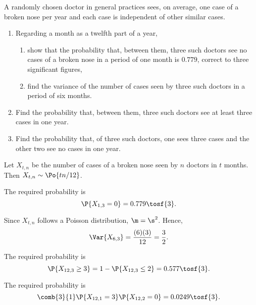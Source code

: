 \begin{problem}
    A randomly chosen doctor in general practices sees, on average, one case of a broken nose per year and each case is independent of other similar cases.

    \begin{enumerate}
        \item Regarding a month as a twelfth part of a year,
        \begin{enumerate}
            \item show that the probability that, between them, three such doctors see no cases of a broken nose in a period of one month is $0.779$, correct to three significant figures,
            \item find the variance of the number of cases seen by three such doctors in a period of six months.
        \end{enumerate}
        \item Find the probability that, between them, three such doctors see at least three cases in one year.
        \item Find the probability that, of three such doctors, one sees three cases and the other two see no cases in one year.
    \end{enumerate}
\end{problem}
\begin{solution}
    Let $X_{t,n}$ be the number of cases of a broken nose seen by $n$ doctors in $t$ months. Then $X_{t,n} \sim \Po{tn/12}$.
    \begin{ppart}
        \begin{psubpart}
            The required probability is \[\P{X_{1,3} = 0} = 0.779 \tosf{3}.\]
        \end{psubpart}
        \begin{psubpart}
            Since $X_{t,n}$ follows a Poisson distribution, $\m = \s^2$. Hence, \[\Var{X_{6, 3}} = \frac{(6)(3)}{12} = \frac32.\]
        \end{psubpart}
    \end{ppart}
    \begin{ppart}
        The required probability is \[\P{X_{12,3} \geq 3} = 1- \P{X_{12,3} \leq 2} = 0.577 \tosf{3}.\]
    \end{ppart}
    \begin{ppart}
        The required probability is \[\comb{3}{1} \P{X_{12,1} = 3}\P{X_{12,2} = 0} = 0.0249 \tosf{3}.\]
    \end{ppart}
\end{solution}

